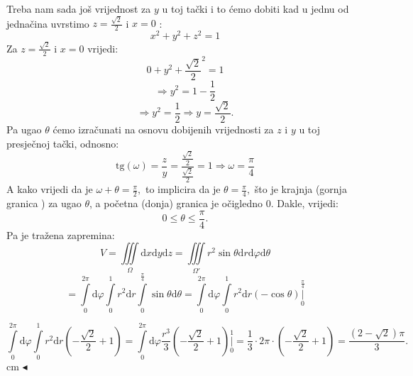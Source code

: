 \documentclass[a4paper,11pt]{article}
\newcommand{\tg}[1]{\text{tg}(#1)}
\begin{document}
Treba nam sada još vrijednost za $y$ u toj tački i to ćemo dobiti kad u jednu od jednačina   uvrstimo $z = \frac{\sqrt{2}}{2}$ i $x = 0 $ :
$$x^{2} + y^{2} + z^{2} = 1 $$
Za  $z = \frac{\sqrt{2} }{2}$ i $x = 0 $ vrijedi:
$$0 + y^{2} + \frac{\sqrt{2}}{2}^{2} = 1 $$
$$\Rightarrow  y^{2} = 1 - \frac{1}{2}   $$
$$\Rightarrow  y^{2} =  \frac{1}{2} \Rightarrow y= \frac{\sqrt{2}}{2} . $$
Pa ugao $\theta$ ćemo izračunati  na osnovu dobijenih vrijednosti za $z$ i $y$ u toj presječnoj tački, odnosno:
$$\tg{\omega} = \frac{z}{y} = \frac{\frac{\sqrt{2}}{2}}{\frac{\sqrt{2}}{2}} = 1 \Rightarrow \omega = \frac{\pi}{4}$$
A kako vrijedi da je $\omega + \theta = \frac{\pi}{2},$ to implicira da je $\theta = \frac{\pi}{4},$ što je krajnja (gornja granica ) za ugao $\theta$, a početna (donja) granica je očigledno $0.$
Dakle, vrijedi:
$$0\leq \theta \leq \frac{\pi}{4}.$$
Pa je tražena zapremina:
$$V=\iiint \limits_{\Omega}    \mathrm dx \mathrm dy \mathrm dz = \iiint \limits_{ \Omega' } r^{2}\sin{\theta}\mathrm dr\mathrm d\varphi \mathrm d\theta    $$
$$= \int\limits_{0}^{2\pi} \mathrm d\varphi \int\limits_{0}^{1} r^{2}\mathrm dr \int\limits_{0}^{\frac{\pi}{4}}  \sin{\theta} \mathrm d\theta=    \int\limits_{0}^{2\pi} \mathrm d\varphi \int\limits_{0}^{1} r^{2}\mathrm dr (-\cos{\theta})\underset{0}{\overset{ \frac{\pi}{4} }{ \bigg\vert}}  $$

$$  \int\limits_{0}^{2\pi} \mathrm d\varphi \int\limits_{0}^{1} r^{2}\mathrm dr \left(-\frac{\sqrt{2}}{2} + 1\right)  =   \int\limits_{0}^{2\pi} \mathrm d\varphi \frac{r^3}{3} \left(-\frac{\sqrt{2}}{2} + 1\right)\underset{0}{\overset{ 1 }{ \bigg\vert}} = \frac{1}{3} \cdot 2\pi \cdot \left(-\frac{\sqrt{2}}{2} + 1\right) = \frac{(2 -\sqrt{2})\pi  }{3} .$$
 cm $\blacktriangleleft$ \\




 
\end{document}

